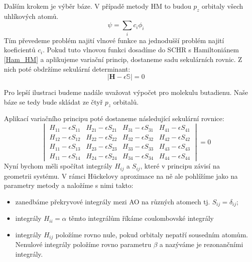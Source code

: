 Dalším krokem je výběr báze. V případě metody HM to budou $p_z$ orbitaly všech uhlíkových atomů.
\begin{equation}
\psi= \sum_i c_i \phi_i
\end{equation}
Tím převedeme problém najití vlnové funkce na jednodušší problém najití koeficientů $c_i$. Pokud tuto vlnovou funkci dosadíme do SCHR s Hamiltoniánem \ref{Ham_HM} a aplikujeme variační princip, dostaneme sadu sekulárních rovnic. Z nich poté obdržíme sekulární determinant:
\begin{equation}
|\mathbf{H}-\epsilon \mathbb{S}|=0
\label{rov:HM_det}
\end{equation}

Pro lepší ilustraci budeme nadále uvažovat výpočet pro molekulu butadienu.
Naše báze se tedy bude skládat ze čtyř $p_z$ orbitalů.

Aplikací variačního principu poté dostaneme následující sekulární rovnice:
\begin{equation}
\begin{vmatrix}
H_{11}-\epsilon S_{11} & H_{21}-\epsilon S_{21} & H_{31}-\epsilon S_{31} & H_{41}-\epsilon S_{41}  \\
H_{12}-\epsilon S_{12} & H_{22}-\epsilon S_{22} & H_{32}-\epsilon S_{32} & H_{42}-\epsilon S_{42}  \\
H_{11}-\epsilon S_{13} & H_{23}-\epsilon S_{23} & H_{33}-\epsilon S_{33} & H_{43}-\epsilon S_{43}  \\
H_{11}-\epsilon S_{14} & H_{24}-\epsilon S_{24} & H_{34}-\epsilon S_{34} & H_{44}-\epsilon S_{44}
\end{vmatrix}
= 0
\end{equation}
Nyní bychom měli spočítat integrály $H_{ij}$ a $S_{ij}$, které v principu závisí na geometrii systému.
V rámci H\"{u}ckelovy aproximace na ně ale pohlížíme jako na parametry metody
a naložíme s nimi takto:
\begin{itemize}
\item zanedbáme překryvové integrály mezi AO na různých atomech tj. $S_{ij}=\delta_{ij}$;
\item integrály $H_{ii}=\alpha$ těmto integrálům říkáme coulombovské integrály
\item integrály $H_{ij}$ položíme rovno nule, pokud orbitaly nepatří sousedním atomům.
Nenulové integrály položíme rovno parametru $\beta$ a nazýváme je rezonančními integrály.
\end{itemize}

